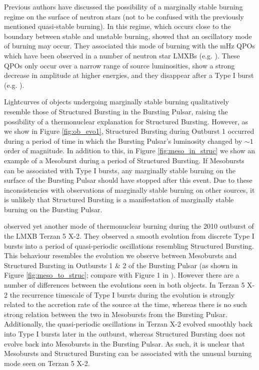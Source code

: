 \par Previous authors have discussed the possibility of a marginally stable burning regime on the surface of neutron stars (not to be confused with the previously mentioned quasi-stable burning).  In this regime, which occurs close to the boundary between stable and unstable burning, \citet{Heger_MargStab} showed that an oscillatory mode of burning may occur.  They associated this mode of burning with the mHz QPOs which have been observed in a number of neutron star LMXBs (e.g. \citealp{Revnivtsev_MargStab,Altamirano_MargStab}).  These QPOs only occur over a narrow range of source luminosities, show a strong decrease in amplitude at higher energies, and they disappear after a Type I burst (e.g. \citealp{Altamirano_MargStab}).
\par Lightcurves of objects undergoing marginally stable burning qualitatively resemble those of Structured Bursting in the Bursting Pulsar, raising the possibility of a thermonuclear explanation for Structured Bursting.  However, as we show in Figure \ref{fig:ob_evo1}, Structured Bursting during Outburst 1 occurred during a period of time in which the Bursting Pulsar's luminosity changed by $\sim1$ order of magnitude.  In addition to this, in Figure \ref{fig:meso_in_struc} we show an example of a Mesoburst during a period of Structured Bursting.  If Mesobursts can be associated with Type I bursts, any marginally stable burning on the surface of the Bursting Pulsar should have stopped after this event.  Due to these inconsistencies with observations of marginally stable burning on other sources, it is unlikely that Structured Bursting is a manifestation of marginally stable burning on the Bursting Pulsar.
\par \citet{Linares_MargStab} observed yet another mode of thermonuclear burning during the 2010 outburst of the LMXB Terzan 5 X-2.  They observed a smooth evolution from discrete Type I bursts into a period of quasi-periodic oscillations resembling Structured Bursting.  This behaviour resembles the evolution we observe between Mesobursts and Structured Bursting in Outbursts 1 \& 2 of the Bursting Pulsar (as shown in Figure \ref{fig:meso_to_struc}; compare with Figure 1 in \citealp{Linares_MargStab}).  However there are a number of differences between the evolutions seen in both objects.  In Terzan 5 X-2 the recurrence timescale of Type I bursts during the evolution is strongly related to the accretion rate of the source at the time, whereas there is no such strong relation between the two in Mesobursts from the Bursting Pulsar.  Additionally, the quasi-periodic oscillations in Terzan X-2 evolved smoothly back into Type I bursts later in the outburst, whereas Structured Bursting does not evolve back into Mesobursts in the Bursting Pulsar.  As such, it is unclear that Mesobursts and Structured Bursting can be associated with the unusual burning mode seen on Terzan 5 X-2.

